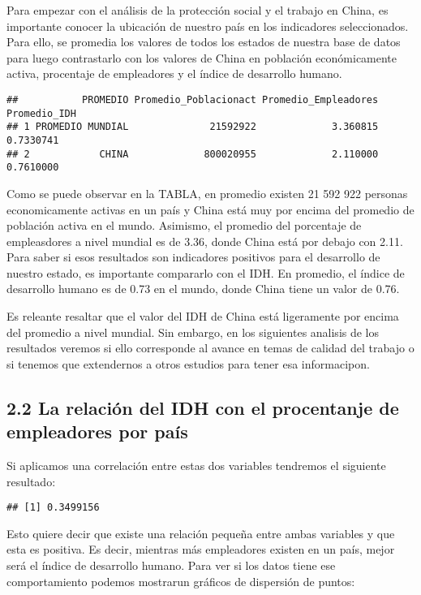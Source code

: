 \documentclass[
]{article}
\begin{document}
Para empezar con el análisis de la protección social y el trabajo en
China, es importante conocer la ubicación de nuestro país en los
indicadores seleccionados. Para ello, se promedia los valores de todos
los estados de nuestra base de datos para luego contrastarlo con los
valores de China en población económicamente activa, procentaje de
empleadores y el índice de desarrollo humano.

\begin{verbatim}
##           PROMEDIO Promedio_Poblacionact Promedio_Empleadores Promedio_IDH
## 1 PROMEDIO MUNDIAL              21592922             3.360815    0.7330741
## 2            CHINA             800020955             2.110000    0.7610000
\end{verbatim}

Como se puede observar en la TABLA, en promedio existen 21 592 922
personas economicamente activas en un país y China está muy por encima
del promedio de población activa en el mundo. Asimismo, el promedio del
porcentaje de empleasdores a nivel mundial es de 3.36, donde China está
por debajo con 2.11. Para saber si esos resultados son indicadores
positivos para el desarrollo de nuestro estado, es importante compararlo
con el IDH. En promedio, el índice de desarrollo humano es de 0.73 en el
mundo, donde China tiene un valor de 0.76.

Es releante resaltar que el valor del IDH de China está ligeramente por
encima del promedio a nivel mundial. Sin embargo, en los siguientes
analisis de los resultados veremos si ello corresponde al avance en
temas de calidad del trabajo o si tenemos que extendernos a otros
estudios para tener esa informacipon.

\hypertarget{la-relaciuxf3n-del-idh-con-el-procentanje-de-empleadores-por-pauxeds}{%
\subsection{2.2 La relación del IDH con el procentanje de empleadores
por
país}\label{la-relaciuxf3n-del-idh-con-el-procentanje-de-empleadores-por-pauxeds}}

Si aplicamos una correlación entre estas dos variables tendremos el
siguiente resultado:

\begin{verbatim}
## [1] 0.3499156
\end{verbatim}

Esto quiere decir que existe una relación pequeña entre ambas variables
y que esta es positiva. Es decir, mientras más empleadores existen en un
país, mejor será el índice de desarrollo humano. Para ver si los datos
tiene ese comportamiento podemos mostrarun gráficos de dispersión de
puntos:
\end{document}
